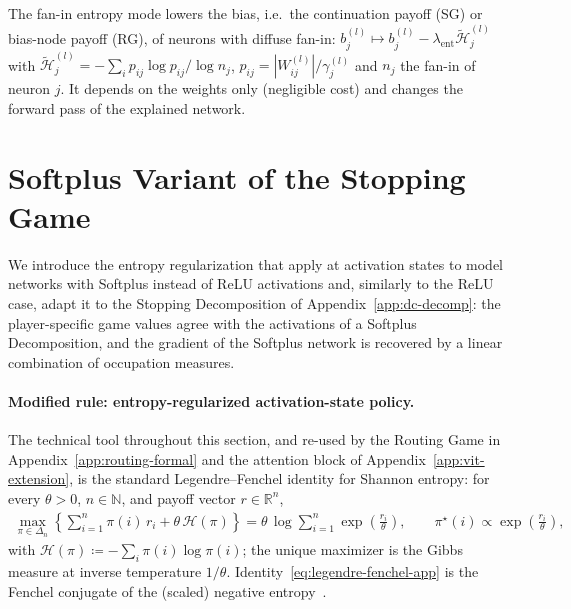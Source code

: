 \documentclass[twoside]{article}
\newcommand{\NN}{\mathbb{N}}
\newcommand{\RR}{\mathbb{R}}
\newcommand{\1}{\mathbf{1}}
\begin{document}
The fan-in entropy mode lowers the bias, i.e.\ the continuation payoff (\ac{SG}) or bias-node
payoff (\ac{RG}), of neurons with diffuse fan-in: $b_j^{(l)} \mapsto b_j^{(l)} -
    \lambda_{\mathrm{ent}}\tilde{\mathcal{H}}_j^{(l)}$ with $\tilde{\mathcal{H}}_j^{(l)} = -\sum_i
    p_{ij}\log p_{ij}/\log n_j$, $p_{ij} = |W_{ij}^{(l)}|/\gamma_j^{(l)}$ and $n_j$ the fan-in of
neuron $j$. It depends on the weights only (negligible cost) and changes the forward pass of the
explained network.
\newpage
\section{Softplus Variant of the Stopping Game}\label{app:softplus-stopping-game}

We introduce the entropy regularization that \citet{Gaubert2025} apply at activation states to
model networks with Softplus instead of ReLU activations and, similarly to the ReLU case, adapt it
to the Stopping Decomposition of Appendix~\ref{app:dc-decomp}: the player-specific game values
agree with the activations of a Softplus Decomposition, and the gradient of the Softplus network is
recovered by a linear combination of occupation measures.

\paragraph{Modified rule: entropy-regularized activation-state policy.}\label{app:softplus-rules}
The technical tool throughout this section, and re-used by the Routing Game in
Appendix~\ref{app:routing-formal} and the attention block of Appendix~\ref{app:vit-extension}, is
the standard Legendre--Fenchel identity for Shannon entropy: for every $\theta>0$, $n\in\NN$, and
payoff vector $r \in \RR^n$,
\begin{align}\label{eq:legendre-fenchel-app}
    \max_{\pi \in \Delta_n} \left\{ \sum_{i=1}^n \pi(i)\, r_i + \theta\, \mathcal{H}(\pi) \right\}
    = \theta\, \log \sum_{i=1}^n \exp\!\left(\frac{r_i}{\theta}\right),
    \qquad \pi^\star(i) \propto \exp\!\left(\frac{r_i}{\theta}\right),
\end{align}
with $\mathcal{H}(\pi) \coloneqq -\sum_i \pi(i)\log \pi(i)$; the unique maximizer is the Gibbs
measure at inverse temperature $1/\theta$. Identity~\eqref{eq:legendre-fenchel-app} is the Fenchel
conjugate of the (scaled) negative entropy~\citep{BoydVandenberghe2004}.
\end{document}
